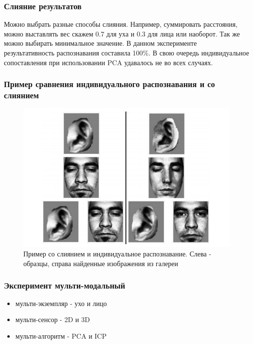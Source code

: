 \documentclass{beamer}
\begin{document}

\begin{frame}
\frametitle{Слияние результатов}

Можно выбрать разные способы слияния.
Например, суммировать расстояния, можно выставлять вес скажем 0.7 для уха и 0.3 для лица или наоборот. 
Так же можно выбирать минимальное значение.
В данном эксперименте результативность распознавания составила 100\%.
В свою очередь индивидуальное сопоставления при использовании PCA удавалось не во всех случаях.

\end{frame}


\begin{frame}
\frametitle{Пример сравнения индивидуального распознавания и со слиянием}

\begin{figure}[h!]
\centering
\includegraphics[scale=0.50]{res/ex_individual_failed}
\caption{Пример со слиянием и индивидуальное распознавание. Слева - образцы, справа найденные изображения из галереи}
\end{figure}

\end{frame}


\begin{frame}
\frametitle{Эксперимент мульти-модальный}

\begin{itemize}
\item мульти-экземпляр - ухо и лицо
\item мульти-сенсор - 2D и 3D
\item мульти-алгоритм - PCA и ICP
\end{itemize}

\end{frame}
\end{document}
